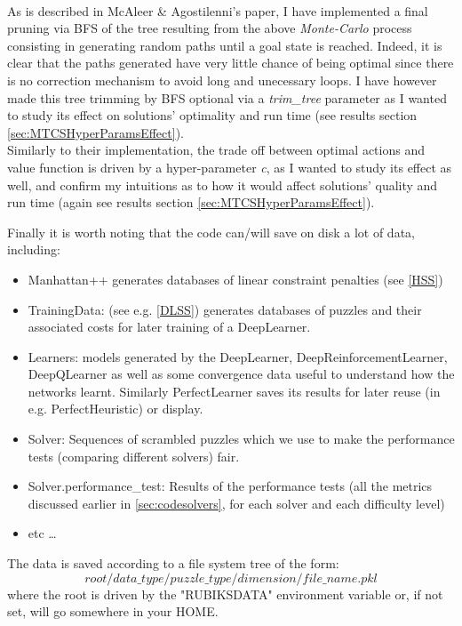 \begin{itemize}
\\ As is described in McAleer \& Agostilenni's paper, I have implemented a final pruning via BFS of the tree resulting from the above \textit{Monte-Carlo} process consisting in generating random paths until a goal state is reached. Indeed, it is clear that the paths generated have very little chance of being optimal since there is no correction mechanism to avoid long and unecessary loops. I have however made this tree trimming by BFS optional via a \textit{trim\_tree} parameter as I wanted to study its effect on solutions' optimality and run time (see results section \ref{sec:MTCSHyperParamsEffect}).
\\
Similarly to their implementation, the trade off between optimal actions and value function is driven by a hyper-parameter \textit{c}, as I wanted to study its effect as well, and confirm my intuitions as to how it would affect solutions' quality and run time (again see results section \ref{sec:MTCSHyperParamsEffect}).

\end{itemize}


Finally it is worth noting that the code can/will save on disk a lot of data, including:
\begin{itemize}
\item Manhattan++ generates databases of linear constraint penalties (see \ref{HSS})
\item TrainingData: (see e.g. \ref{DLSS}) generates databases of puzzles and their associated costs for later training of a DeepLearner.
\item Learners: models generated by the DeepLearner, DeepReinforcementLearner, DeepQLearner as well as some convergence data useful to understand how the networks learnt. Similarly PerfectLearner saves its results for later reuse (in e.g. PerfectHeuristic) or display.
\item Solver: Sequences of scrambled puzzles which we use to make the performance tests (comparing different solvers) fair.
\item Solver.performance\_test: Results of the performance tests (all the metrics discussed earlier in \ref{sec:codesolvers}, for each solver and each difficulty level)
\item etc \dots
\end{itemize}
The data is saved according to a file system tree of the form:
$$root/data\_type/puzzle\_type/dimension/file\_name.pkl$$
where the root is driven by the "RUBIKSDATA" environment variable or, if not set, will go somewhere in your HOME.

